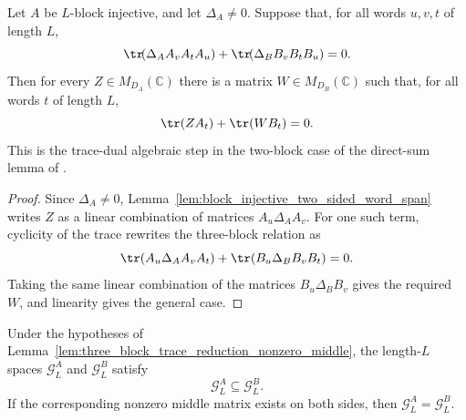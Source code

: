 \begin{lemma}
    \label{lem:three_block_trace_reduction_nonzero_middle}
    \leanok
    Let $A$ be $L$-block injective, and let $\Delta_A\neq 0$.
    Suppose that, for all words $u,v,t$ of length $L$,
    \[
        \tr\!(\Delta_A A_v A_t A_u)
        + \tr\!(\Delta_B B_v B_t B_u)=0.
    \]
    Then for every $Z\in M_{D_A}(\mathbb C)$ there is a matrix
    $W\in M_{D_B}(\mathbb C)$ such that, for all words $t$ of
    length $L$,
    \[
        \tr(ZA_t)+\tr(WB_t)=0.
    \]
    This is the trace-dual algebraic step in the two-block case of the
    direct-sum lemma of \cite{PerezGarcia2007Matrix}.
\end{lemma}

\begin{proof}\leanok{}
    Since $\Delta_A\neq0$, Lemma~\ref{lem:block_injective_two_sided_word_span}
    writes $Z$ as a linear combination of matrices $A_u\Delta_A A_v$.
    For one such term, cyclicity of the trace rewrites the three-block relation
    as
    \[
        \tr(A_u\Delta_A A_vA_t)
        +\tr(B_u\Delta_B B_vB_t)=0.
    \]
    Taking the same linear combination of the matrices $B_u\Delta_BB_v$
    gives the required $W$, and linearity gives the general case.
\end{proof}

\begin{lemma}
    \label{lem:three_block_relation_ground_space_inclusion}
    \leanok
    Under the hypotheses of
    Lemma~\ref{lem:three_block_trace_reduction_nonzero_middle}, the length-$L$
    spaces \(\mathcal G_L^A\) and \(\mathcal G_L^B\) satisfy
    \[
        \mathcal G_L^A \subseteq \mathcal G_L^B.
    \]
    If the corresponding nonzero middle matrix exists on both sides, then
    $\mathcal G_L^A=\mathcal G_L^B$.
\end{lemma}

